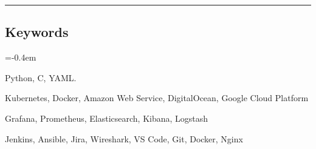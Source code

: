 \documentclass[11pt,a4paper]{article}
\begin{document}
\hrule
\vspace{-1.0em}
\subsection*{Keywords}
\begin{description}[labelindent=\parindent]
  \parskip=-0.4em
\item[Languages:] Python, C, YAML.
  \item[Infrastructure:] Kubernetes, Docker, Amazon Web Service, DigitalOcean, Google Cloud Platform
  \item[Monitoring/Log:] Grafana, Prometheus, Elasticsearch, Kibana, Logstash
  \item[Tools:] Jenkins, Ansible, Jira, Wireshark, VS Code, Git, Docker, Nginx
\end{description}
\end{document}
